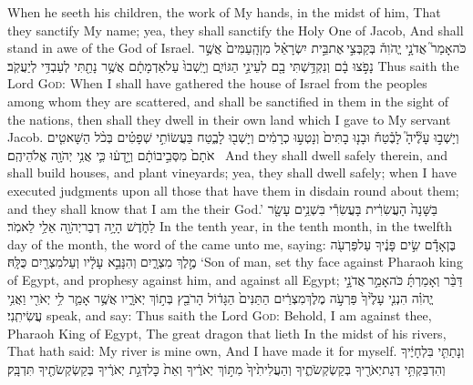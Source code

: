 {When he seeth his children, the work of My hands, in the midst of him, That they sanctify My name; yea, they shall sanctify the Holy One of Jacob, And shall stand in awe of the God of Israel.}
\label{haft_14}
\setcounter{chap}{28}
\setcounter{verse}{25}
{כֹּה\maqqaf אָמַר֮ אֲדֹנָ֣י יֱהֹוִה֒ בְּקַבְּצִ֣י \legarmeh  אֶת\maqqaf בֵּ֣ית יִשְׂרָאֵ֗ל מִן\maqqaf הָֽעַמִּים֙ אֲשֶׁ֣ר נָפֹ֣צוּ בָ֔ם וְנִקְדַּ֥שְׁתִּי בָ֖ם לְעֵינֵ֣י הַגּוֹיִ֑ם וְיָֽשְׁבוּ֙ עַל\maqqaf אַדְמָתָ֔ם אֲשֶׁ֥ר נָתַ֖תִּי לְעַבְדִּ֥י לְיַעֲקֹֽב׃}
{Thus saith the Lord \textsc{God}: When I shall have gathered the house of Israel from the peoples among whom they are scattered, and shall be sanctified in them in the sight of the nations, then shall they dwell in their own land which I gave to My servant Jacob.}
{וְיָשְׁב֣וּ עָלֶ֘יהָ֮ לָבֶ֒טַח֒ וּבָנ֤וּ בָתִּים֙ וְנָטְע֣וּ כְרָמִ֔ים וְיָשְׁב֖וּ לָבֶ֑טַח בַּעֲשׂוֹתִ֣י שְׁפָטִ֗ים בְּכֹ֨ל הַשָּׁאטִ֤ים אֹתָם֙ מִסְּבִ֣יבוֹתָ֔ם וְיָ֣דְע֔וּ כִּ֛י אֲנִ֥י יְהֹוָ֖ה אֱלֹהֵיהֶֽם׃ \petucha }
{And they shall dwell safely therein, and shall build houses, and plant vineyards; yea, they shall dwell safely; when I have executed judgments upon all those that have them in disdain round about them; and they shall know that I am the \lord\space their God.’}
\newperek
{}
{בַּשָּׁנָה֙ הָעֲשִׂרִ֔ית בָּעֲשִׂרִ֕י בִּשְׁנֵ֥ים עָשָׂ֖ר לַחֹ֑דֶשׁ הָיָ֥ה דְבַר\maqqaf יְהֹוָ֖ה אֵלַ֥י לֵאמֹֽר׃}
{In the tenth year, in the tenth month, in the twelfth day of the month, the word of the \lord\space came unto me, saying:}
{בֶּן\maqqaf אָדָ֕ם שִׂ֣ים פָּנֶ֔יךָ עַל\maqqaf פַּרְעֹ֖ה מֶ֣לֶךְ מִצְרָ֑יִם וְהִנָּבֵ֣א עָלָ֔יו וְעַל\maqqaf מִצְרַ֖יִם כֻּלָּֽהּ׃}
{‘Son of man, set thy face against Pharaoh king of Egypt, and prophesy against him, and against all Egypt;}
{דַּבֵּ֨ר וְאָמַרְתָּ֜ כֹּה\maqqaf אָמַ֣ר \legarmeh  אֲדֹנָ֣י יֱהֹוִ֗ה הִנְנִ֤י עָלֶ֙יךָ֙ פַּרְעֹ֣ה מֶלֶךְ\maqqaf מִצְרַ֔יִם הַתַּנִּים֙ הַגָּד֔וֹל הָרֹבֵ֖ץ בְּת֣וֹךְ יְאֹרָ֑יו אֲשֶׁ֥ר אָמַ֛ר לִ֥י יְאֹרִ֖י וַאֲנִ֥י עֲשִׂיתִֽנִי׃}
{speak, and say: Thus saith the Lord \textsc{God}: Behold, I am against thee, Pharaoh King of Egypt, The great dragon that lieth In the midst of his rivers, That hath said: My river is mine own, And I have made it for myself.}
{וְנָתַתִּ֤י  בִּלְחָיֶ֔יךָ וְהִדְבַּקְתִּ֥י דְגַת\maqqaf יְאֹרֶ֖יךָ בְּקַשְׂקְשֹׂתֶ֑יךָ וְהַעֲלִיתִ֙יךָ֙ מִתּ֣וֹךְ יְאֹרֶ֔יךָ וְאֵת֙ כׇּל\maqqaf דְּגַ֣ת יְאֹרֶ֔יךָ בְּקַשְׂקְשֹׂתֶ֖יךָ תִּדְבָּֽק׃}
